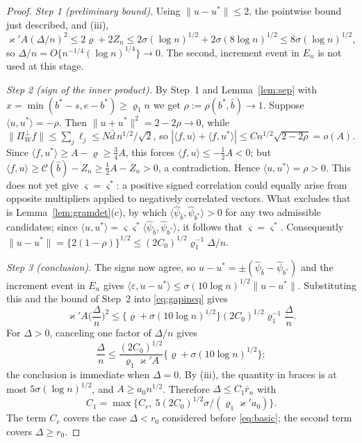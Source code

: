 \documentclass[10pt,a4paper]{amsart}
\begin{document}
\begin{proof}
\emph{Step 1 (preliminary bound).} Using $\|u-u^*\| \le 2$, the pointwise bound just described, and (iii), $\varkappa' A(\Delta/n)^2 \le 2\varrho + 2Z_n \le 2\sigma(\log n)^{1/2} + 2\sigma(8\log n)^{1/2} \le 8\sigma(\log n)^{1/2}$, so $\Delta/n = O\{n^{-1/4}(\log n)^{1/4}\} \to 0$. The second, increment event in $E_n$ is not used at this stage.

\emph{Step 2 (sign of the inner product).} By Step~1 and Lemma~\ref{lem:sep} with $x = \min(b^*-s,e-b^*) \ge \varrho_1 n$ we get $\rho := \rho(b^*,\hat b) \to 1$. Suppose $\langle u,u^*\rangle = -\rho$. Then $\|u+u^*\|^2 = 2-2\rho \to 0$, while $\|\Pi^\perp_W f\| \le \sum_j \ell_j \le N\bar d\, n^{1/2}/\sqrt2$, so
$|\langle f,u\rangle + \langle f,u^*\rangle| \le Cn^{1/2}\sqrt{2-2\rho} =
o(A)$. Since $\langle f,u^*\rangle \ge A - \varrho \ge \tfrac34 A$, this forces
$\langle f,u\rangle \le -\tfrac12 A < 0$; but
$\langle f,u\rangle \ge \mathcal{C}(\hat b) - Z_n \ge \tfrac12 A - Z_n > 0$, a
contradiction. Hence $\langle u,u^*\rangle = \rho > 0$. This does not yet give $\varsigma = \varsigma^*$: a positive signed correlation could equally arise from opposite multipliers applied to negatively correlated vectors. What excludes that is Lemma~\ref{lem:gramdet}(c), by which $\langle\hat\psi_{\hat b},\hat\psi_{b^*}\rangle > 0$ for any two admissible candidates; since $\langle u,u^*\rangle = \varsigma\varsigma^*\langle\hat\psi_{\hat b},\hat\psi_{b^*}\rangle$, it follows that $\varsigma = \varsigma^*$. Consequently $\|u-u^*\| = \{2(1-\rho)\}^{1/2} \le (2C_0)^{1/2}\varrho_1^{-1}\Delta/n$.

\emph{Step 3 (conclusion).} The signs now agree, so
$u-u^*=\pm(\hat\psi_{\hat b}-\hat\psi_{b^*})$ and the increment event in
$E_n$ gives
$\langle\varepsilon,u-u^*\rangle
\le\sigma(10\log n)^{1/2}\|u-u^*\|$. Substituting this and the bound of
Step~2 into \eqref{eq:gapineq} gives
\[
\varkappa' A\Big(\frac{\Delta}{n}\Big)^2
\le \big\{\varrho+\sigma(10\log n)^{1/2}\big\}
(2C_0)^{1/2}\varrho_1^{-1}\frac{\Delta}{n}.
\]
For $\Delta>0$, canceling one factor of $\Delta/n$ gives
\[
\frac{\Delta}{n}
\le\frac{(2C_0)^{1/2}}{\varrho_1\varkappa' A}
\big\{\varrho+\sigma(10\log n)^{1/2}\big\};
\]
the conclusion is immediate when $\Delta=0$. By (iii), the quantity in braces
is at most $5\sigma(\log n)^{1/2}$, and $A\ge a_0n^{1/2}$. Therefore
$\Delta\le C_1\bar r_n$ with
\[
C_1=\max\{C_r,\ 5(2C_0)^{1/2}\sigma/(\varrho_1\varkappa'a_0)\}.
\]
The term $C_r$ covers the case $\Delta<r_0$ considered before
\eqref{eq:basic}; the second term covers $\Delta\ge r_0$.
\end{proof}
\end{document}
